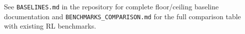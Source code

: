 See \texttt{BASELINES.md} in the repository for complete floor/ceiling baseline documentation
and \texttt{BENCHMARKS\_COMPARISON.md} for the full comparison table with existing RL benchmarks.



